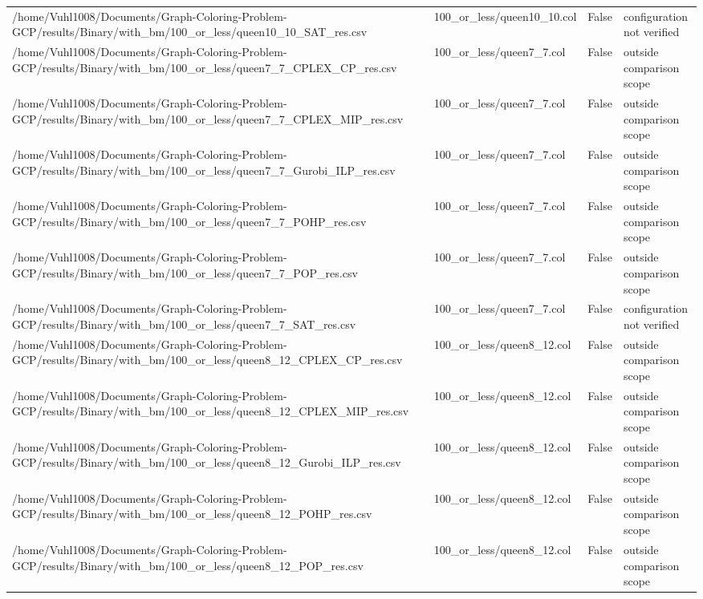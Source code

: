 \begin{table}[htbp]
\begin{tabular}{llll}
/home/Vuhl1008/Documents/Graph-Coloring-Problem-GCP/results/Binary/with\_bm/100\_or\_less/queen10\_10\_SAT\_res.csv & 100\_or\_less/queen10\_10.col & False & configuration not verified \\
/home/Vuhl1008/Documents/Graph-Coloring-Problem-GCP/results/Binary/with\_bm/100\_or\_less/queen7\_7\_CPLEX\_CP\_res.csv & 100\_or\_less/queen7\_7.col & False & outside comparison scope \\
/home/Vuhl1008/Documents/Graph-Coloring-Problem-GCP/results/Binary/with\_bm/100\_or\_less/queen7\_7\_CPLEX\_MIP\_res.csv & 100\_or\_less/queen7\_7.col & False & outside comparison scope \\
/home/Vuhl1008/Documents/Graph-Coloring-Problem-GCP/results/Binary/with\_bm/100\_or\_less/queen7\_7\_Gurobi\_ILP\_res.csv & 100\_or\_less/queen7\_7.col & False & outside comparison scope \\
/home/Vuhl1008/Documents/Graph-Coloring-Problem-GCP/results/Binary/with\_bm/100\_or\_less/queen7\_7\_POHP\_res.csv & 100\_or\_less/queen7\_7.col & False & outside comparison scope \\
/home/Vuhl1008/Documents/Graph-Coloring-Problem-GCP/results/Binary/with\_bm/100\_or\_less/queen7\_7\_POP\_res.csv & 100\_or\_less/queen7\_7.col & False & outside comparison scope \\
/home/Vuhl1008/Documents/Graph-Coloring-Problem-GCP/results/Binary/with\_bm/100\_or\_less/queen7\_7\_SAT\_res.csv & 100\_or\_less/queen7\_7.col & False & configuration not verified \\
/home/Vuhl1008/Documents/Graph-Coloring-Problem-GCP/results/Binary/with\_bm/100\_or\_less/queen8\_12\_CPLEX\_CP\_res.csv & 100\_or\_less/queen8\_12.col & False & outside comparison scope \\
/home/Vuhl1008/Documents/Graph-Coloring-Problem-GCP/results/Binary/with\_bm/100\_or\_less/queen8\_12\_CPLEX\_MIP\_res.csv & 100\_or\_less/queen8\_12.col & False & outside comparison scope \\
/home/Vuhl1008/Documents/Graph-Coloring-Problem-GCP/results/Binary/with\_bm/100\_or\_less/queen8\_12\_Gurobi\_ILP\_res.csv & 100\_or\_less/queen8\_12.col & False & outside comparison scope \\
/home/Vuhl1008/Documents/Graph-Coloring-Problem-GCP/results/Binary/with\_bm/100\_or\_less/queen8\_12\_POHP\_res.csv & 100\_or\_less/queen8\_12.col & False & outside comparison scope \\
/home/Vuhl1008/Documents/Graph-Coloring-Problem-GCP/results/Binary/with\_bm/100\_or\_less/queen8\_12\_POP\_res.csv & 100\_or\_less/queen8\_12.col & False & outside comparison scope \\

\end{tabular}
\end{table}
